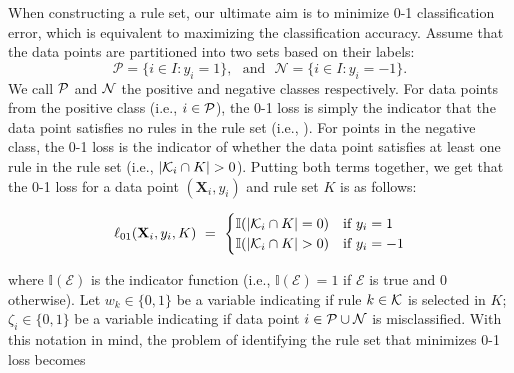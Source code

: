 \documentclass[twoside,11pt]{article}
\begin{document}
 When constructing a rule set, our ultimate aim is to minimize 0-1 classification error, which is equivalent to maximizing the classification accuracy. Assume that the data points are partitioned into two sets based on their labels: 
	\begin{equation*}\mathcal{P} = \{i\in I : y_i = 1\},\text{~~and~~}\mathcal{N} = \{i\in I : y_i = -1\}.\end{equation*}
We call ${\cal P}$ and ${\cal N}$ the positive and negative classes respectively.  For data points from the positive class (i.e., $i \in {\cal P}$), the 0-1 loss is simply the indicator that the data point satisfies no rules in the rule set (i.e., ). For points in the negative class, the 0-1 loss is the indicator of whether the data point satisfies at least one rule in the rule set (i.e., $\abs{\mathcal{K}_i \cap K} > 0$). Putting both terms together, we get that the 0-1 loss for a data point $(\textbf{X}_i, y_i)$ and rule set $K$ is as follows:

\begin{definition}[0-1 loss]
$$\ell_{01}(\textbf{X}_i, y_i, K) ~=~
\begin{cases}
\mathbb{I}(\abs{{\cal K}_i \cap K }= 0) & \text{if } y_i = 1\\
\mathbb{I}(\abs{\mathcal{K}_i \cap K} > 0)&\text{if } y_i = -1
\end{cases}$$
\end{definition}
\noindent
where $\mathbb{I}(\mathcal{E})$ is the indicator function (i.e., $\mathbb{I}(\mathcal{E}) = 1$ if $\mathcal{E}$ is true and 0 otherwise). Let  $w_{k}\in\{0,1\}$  be a  variable indicating if rule $k\in\K$ is selected in $K$;  $\zeta_i\in\{0,1\}$  be a  variable indicating if data point $i\in \P \cup {\cal N}$ is misclassified. With this notation in mind, the problem of identifying the rule set that minimizes 0-1 loss becomes
\end{document}
